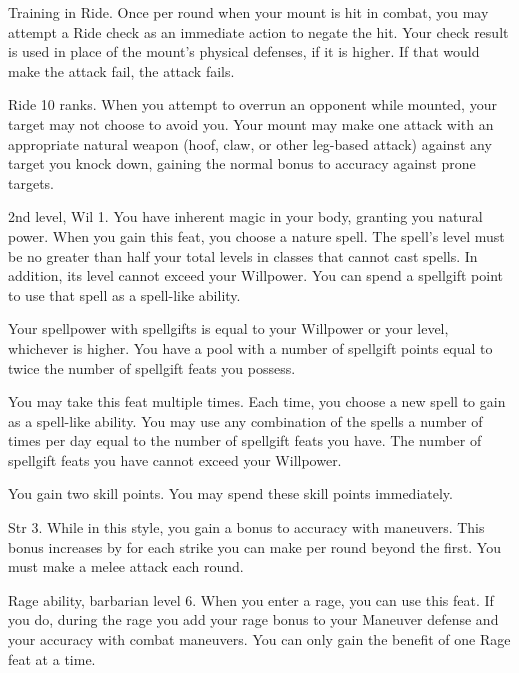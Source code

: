\featpre Training in Ride.
\featben Once per round when your mount is hit in combat, you may attempt a Ride check as an immediate action to negate the hit.
Your check result is used in place of the mount's physical defenses, if it is higher.
If that would make the attack fail, the attack fails.

\featpre Ride 10 ranks.
\featben When you attempt to overrun an opponent while mounted, your target may not choose to avoid you.
Your mount may make one attack with an appropriate natural weapon (hoof, claw, or other leg-based attack) against any target you knock down, gaining the normal  bonus to accuracy against prone targets.

\featpres 2nd level, Wil 1.
\featben You have inherent magic in your body, granting you natural power.
When you gain this feat, you choose a nature spell.
The spell's level must be no greater than half your total levels in classes that cannot cast spells.
In addition, its level cannot exceed your Willpower.
You can spend a spellgift point to use that spell as a spell-like ability.

Your spellpower with spellgifts is equal to your Willpower or your level, whichever is higher.
You have a pool with a number of spellgift points equal to twice the number of spellgift feats you possess.

You may take this feat multiple times.
Each time, you choose a new spell to gain as a spell-like ability.
You may use any combination of the spells a number of times per day equal to the number of spellgift feats you have.
The number of spellgift feats you have cannot exceed your Willpower.

\featben You gain two skill points.
You may spend these skill points immediately.

\featpre Str 3.
\featben While in this style, you gain a  bonus to accuracy with maneuvers.
This bonus increases by  for each strike you can make per round beyond the first.
\stylereq You must make a melee attack each round.

\featpre Rage ability, barbarian level 6.
\featben When you enter a rage, you can use this feat. If you do, during the rage you add your rage bonus to your Maneuver defense and your accuracy with combat maneuvers.
 You can only gain the benefit of one Rage feat at a time.

